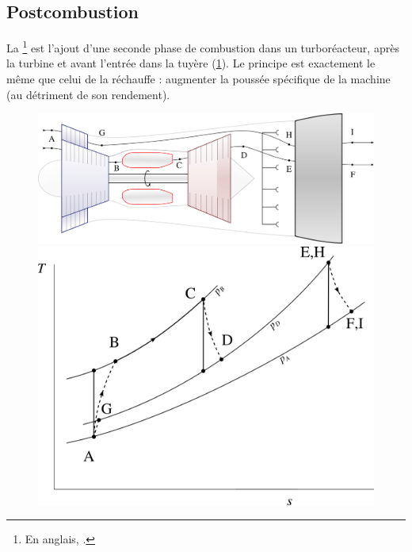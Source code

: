 {{	\subsection{Postcombustion}
	\label{ch_postcombustion}

		La \footnote{En anglais, .} est l’ajout d’une seconde phase de combustion dans un turboréacteur, après la turbine et avant l’entrée dans la tuyère (\cref{fig_postcombustion}). Le principe est exactement le même que celui de la réchauffe : augmenter la poussée spécifique de la machine (au détriment de son rendement).

		\begin{figure}
			\begin{center}
				\includegraphics[scale=0.6]{images/circuit_postcombustion.png}\vspace{0.5cm}
				\includegraphics[scale=0.8]{images/ts_gp_postcombustion.png}
			\end{center}
			\label{fig_postcombustion}
		\end{figure}

}}

